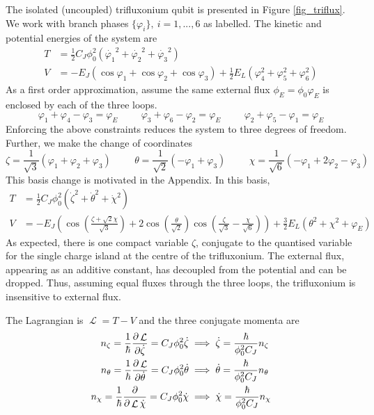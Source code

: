 \documentclass[11pt]{article}
\DeclareMathOperator{\lagr}{\mathcal{L}}
\begin{document}
The isolated (uncoupled) trifluxonium qubit is presented in Figure \ref{fig_triflux}. We work with branch phases $\{\varphi_i\}, \ i=1,...,6$ as labelled. The kinetic and potential energies of the system are
\begin{align}
T &= \frac{1}{2} C_J \phi_0^2 (\dot{\varphi_1}^2 + \dot{\varphi_2}^2 + \dot{\varphi_3}^2) \\
V &= -E_J (\cos{\varphi_1} + \cos{\varphi_2} + \cos{\varphi_3}) + \frac{1}{2} E_L (\varphi_4^2 + \varphi_5^2 + \varphi_6^2)
\end{align}
As a first order approximation, assume the same external flux $\phi_E=\phi_0 \varphi_E$ is enclosed by each of the three loops. 
\begin{equation}
\varphi_1 + \varphi_4 - \varphi_3 = \varphi_E
\hspace{1cm}
\varphi_3 + \varphi_6 - \varphi_2 = \varphi_E
\hspace{1cm}
\varphi_2 + \varphi_5 - \varphi_1 = \varphi_E
\end{equation}
Enforcing the above constraints reduces the system to three degrees of freedom. Further, we make the change of coordinates
\begin{equation}
\zeta = \frac{1}{\sqrt{3}} (\varphi_1 + \varphi_2 + \varphi_3)
\hspace{1cm}
\theta = \frac{1}{\sqrt{2}} (-\varphi_1 + \varphi_3)
\hspace{1cm}
\chi = \frac{1}{\sqrt{6}} (-\varphi_1 + 2 \varphi_2 - \varphi_3)
\end{equation}
This basis change is motivated in the Appendix. In this basis,
\begin{align}
T &= \frac{1}{2} C_J \phi_0^2 (\dot{\zeta}^2 + \dot{\theta}^2 + \dot{\chi}^2) \\
V &= -E_J \left( \cos{\left(\frac{\zeta + \sqrt{2} \chi}{\sqrt{3}}\right)} + 2 \cos{\left(\frac{\theta}{\sqrt{2}}\right)} \cos{\left(\frac{\zeta}{\sqrt{3}} - \frac{\chi}{\sqrt{6}}\right)} \right) + \frac{3}{2} E_L (\theta^2 + \chi^2 + \varphi_E)
\end{align}
As expected, there is one compact variable $\zeta$, conjugate to the quantised variable for the single charge island at the centre of the trifluxonium. The external flux, appearing as an additive constant, has decoupled from the potential and can be dropped. Thus, assuming equal fluxes through the three loops, the trifluxonium is insensitive to external flux.

The Lagrangian is $\lagr = T - V$ and the three conjugate momenta are
\begin{align}
n_\zeta 
= \frac{1}{\hbar} \pdv{\lagr}{\dot{\zeta}} = C_J \phi_0^2 \dot{\zeta}
&\implies \dot{\zeta} = \frac{\hbar}{\phi_0^2 C_J} n_\zeta \\
n_\theta
= \frac{1}{\hbar} \pdv{\lagr}{\dot{\theta}} = C_J \phi_0^2 \dot{\theta}
&\implies \dot{\theta} = \frac{\hbar}{\phi_0^2 C_J} n_\theta \\
n_\chi
= \frac{1}{\hbar} \pdv{\lagr{\dot{\chi}}} = C_J \phi_0^2 \dot{\chi}
&\implies \dot{\chi} = \frac{\hbar}{\phi_0^2 C_J} n_\chi
\end{align}
\end{document}
